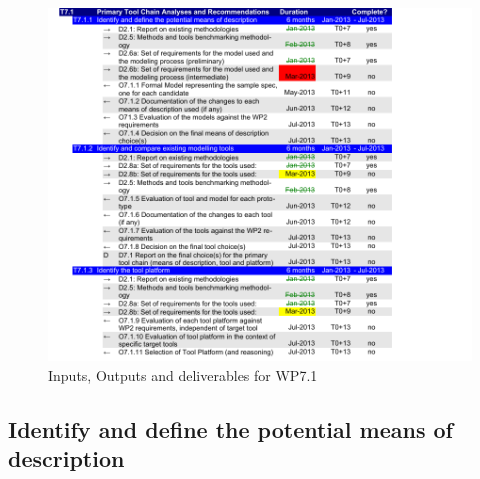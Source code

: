 \documentclass{template/openetcs_article}
\begin{document}
\begin{figure}[!ht]
	\begin{center}
	\includegraphics[width=\textwidth,page=1]{project_plan/WP7_Project_Management.pdf}
	\caption{Inputs, Outputs and deliverables for WP7.1}
	\label{fig:wrspm}
	\end{center}
\end{figure}

\subsection{Identify and define the potential means of description}
\label{sec:language}
\end{document}
